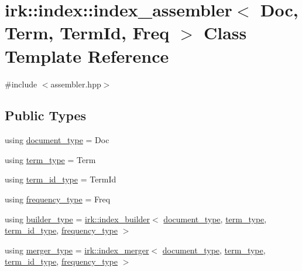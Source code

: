 \hypertarget{classirk_1_1index_1_1index__assembler}{}\section{irk\+:\+:index\+:\+:index\+\_\+assembler$<$ Doc, Term, Term\+Id, Freq $>$ Class Template Reference}
\label{classirk_1_1index_1_1index__assembler}


{\ttfamily \#include $<$assembler.\+hpp$>$}

\subsection*{Public Types}
\begin{DoxyCompactItemize}
\item 
using \mbox{\hyperlink{classirk_1_1index_1_1index__assembler_a42424117b672fc1383b3be13f3338bc4}{document\+\_\+type}} = Doc
\item 
using \mbox{\hyperlink{classirk_1_1index_1_1index__assembler_a1dec315f145c0e887e0035c3b7f23235}{term\+\_\+type}} = Term
\item 
using \mbox{\hyperlink{classirk_1_1index_1_1index__assembler_ad632345d29f93e9f10fbc7e91db41f77}{term\+\_\+id\+\_\+type}} = Term\+Id
\item 
using \mbox{\hyperlink{classirk_1_1index_1_1index__assembler_a8da91d64fb4a68136f7978944e7f3373}{frequency\+\_\+type}} = Freq
\item 
using \mbox{\hyperlink{classirk_1_1index_1_1index__assembler_a76cb9e6d85a87c9f7d96148e1f28f56e}{builder\+\_\+type}} = \mbox{\hyperlink{classirk_1_1index__builder}{irk\+::index\+\_\+builder}}$<$ \mbox{\hyperlink{classirk_1_1index_1_1index__assembler_a42424117b672fc1383b3be13f3338bc4}{document\+\_\+type}}, \mbox{\hyperlink{classirk_1_1index_1_1index__assembler_a1dec315f145c0e887e0035c3b7f23235}{term\+\_\+type}}, \mbox{\hyperlink{classirk_1_1index_1_1index__assembler_ad632345d29f93e9f10fbc7e91db41f77}{term\+\_\+id\+\_\+type}}, \mbox{\hyperlink{classirk_1_1index_1_1index__assembler_a8da91d64fb4a68136f7978944e7f3373}{frequency\+\_\+type}} $>$
\item 
using \mbox{\hyperlink{classirk_1_1index_1_1index__assembler_a059327e71e4de55d8b5872b7775399ed}{merger\+\_\+type}} = \mbox{\hyperlink{classirk_1_1index__merger}{irk\+::index\+\_\+merger}}$<$ \mbox{\hyperlink{classirk_1_1index_1_1index__assembler_a42424117b672fc1383b3be13f3338bc4}{document\+\_\+type}}, \mbox{\hyperlink{classirk_1_1index_1_1index__assembler_a1dec315f145c0e887e0035c3b7f23235}{term\+\_\+type}}, \mbox{\hyperlink{classirk_1_1index_1_1index__assembler_ad632345d29f93e9f10fbc7e91db41f77}{term\+\_\+id\+\_\+type}}, \mbox{\hyperlink{classirk_1_1index_1_1index__assembler_a8da91d64fb4a68136f7978944e7f3373}{frequency\+\_\+type}} $>$
\end{DoxyCompactItemize}
